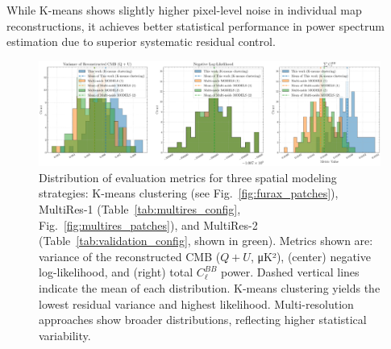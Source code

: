 \documentclass[fleqn,usenatbib]{mnras}
\begin{document}
While K-means shows slightly higher pixel-level noise in individual map reconstructions, it achieves better statistical performance in power spectrum estimation due to superior systematic residual control.

\begin{figure}
    \centering
    \includegraphics[width=1\linewidth]{figures/variance_likelihood_distributions.pdf}
    \caption{
    Distribution of evaluation metrics for three spatial modeling strategies: K-means clustering (see Fig.~\protect\ref{fig:furax_patches}), MultiRes-1 (Table~\protect\ref{tab:multires_config}, Fig.~\protect\ref{fig:multires_patches}), and MultiRes-2 (Table~\protect\ref{tab:validation_config}, shown in green). 
    Metrics shown are: variance of the reconstructed CMB ($Q + U$, μK²), (center) negative log-likelihood, and (right) total $C_\ell^{BB}$ power. 
    Dashed vertical lines indicate the mean of each distribution. 
    K-means clustering yields the lowest residual variance and highest likelihood. 
    Multi-resolution approaches show broader distributions, reflecting higher statistical variability.
    }


    \label{fig:metric_distributions}
\end{figure}

\vspace{-1em}
\end{document}
